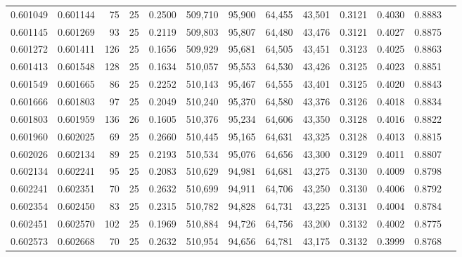 \begin{tabular}{rrrrrrrrrrrrr}
0.601049 & 0.601144 &    75 &  25 &                                     0.2500 & 509,710 &  95,900 &  64,455 &  43,501 & 0.3121 & 0.4030 & 0.8883 \\
0.601145 & 0.601269 &    93 &  25 &                                     0.2119 & 509,803 &  95,807 &  64,480 &  43,476 & 0.3121 & 0.4027 & 0.8875 \\
0.601272 & 0.601411 &   126 &  25 &                                     0.1656 & 509,929 &  95,681 &  64,505 &  43,451 & 0.3123 & 0.4025 & 0.8863 \\
0.601413 & 0.601548 &   128 &  25 &                                     0.1634 & 510,057 &  95,553 &  64,530 &  43,426 & 0.3125 & 0.4023 & 0.8851 \\
0.601549 & 0.601665 &    86 &  25 &                                     0.2252 & 510,143 &  95,467 &  64,555 &  43,401 & 0.3125 & 0.4020 & 0.8843 \\
0.601666 & 0.601803 &    97 &  25 &                                     0.2049 & 510,240 &  95,370 &  64,580 &  43,376 & 0.3126 & 0.4018 & 0.8834 \\
0.601803 & 0.601959 &   136 &  26 &                                     0.1605 & 510,376 &  95,234 &  64,606 &  43,350 & 0.3128 & 0.4016 & 0.8822 \\
0.601960 & 0.602025 &    69 &  25 &                                     0.2660 & 510,445 &  95,165 &  64,631 &  43,325 & 0.3128 & 0.4013 & 0.8815 \\
0.602026 & 0.602134 &    89 &  25 &                                     0.2193 & 510,534 &  95,076 &  64,656 &  43,300 & 0.3129 & 0.4011 & 0.8807 \\
0.602134 & 0.602241 &    95 &  25 &                                     0.2083 & 510,629 &  94,981 &  64,681 &  43,275 & 0.3130 & 0.4009 & 0.8798 \\
0.602241 & 0.602351 &    70 &  25 &                                     0.2632 & 510,699 &  94,911 &  64,706 &  43,250 & 0.3130 & 0.4006 & 0.8792 \\
0.602354 & 0.602450 &    83 &  25 &                                     0.2315 & 510,782 &  94,828 &  64,731 &  43,225 & 0.3131 & 0.4004 & 0.8784 \\
0.602451 & 0.602570 &   102 &  25 &                                     0.1969 & 510,884 &  94,726 &  64,756 &  43,200 & 0.3132 & 0.4002 & 0.8775 \\
0.602573 & 0.602668 &    70 &  25 &                                     0.2632 & 510,954 &  94,656 &  64,781 &  43,175 & 0.3132 & 0.3999 & 0.8768 \\

\end{tabular}

